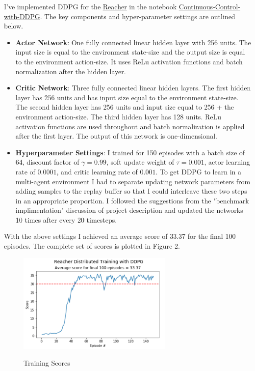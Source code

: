 \documentclass[sigchi]{acmart}
\begin{document}
I've implemented DDPG for the \href{https://github.com/Unity-Technologies/ml-agents/blob/master/docs/Learning-Environment-Examples.md#reacher}{\underline{Reacher}}
in the notebook 
\href{https://nbviewer.jupyter.org/github/bobflagg/Continuous-Control/blob/master/01-Continuous-Control-with-DDPG.ipynb}{\underline{Continuous-Control-with-DDPG}}.
The key components and hyper-parameter settings are outlined below.
\begin{itemize}
	\item \textbf{Actor Network}: One fully connected linear hidden layer with 256 units. The input size is equal to the environment state-size and the output size is equal to the environment action-size. It uses ReLu activation functions and batch normalization after the hidden layer.
	\item \textbf{Critic Network}: Three fully connected linear hidden layers. The first hidden layer has 256 units and has input size equal to the environment state-size. The second hidden layer has 256 units and input size equal to 256 + the environment action-size. The third hidden layer has 128 units. ReLu activation functions are used throughout  and batch normalization is applied after the first layer. The output of this network is one-dimensional.
	\item \textbf{Hyperparameter Settings}: 
	I trained for 150 episodes with a batch size of 64, discount factor of $\gamma = 0.99$, soft update weight of $\tau = 0.001$, actor learning rate of $0.0001$, 
	 and critic learning rate of $0.001$.  To get DDPG to learn in a multi-agent environment I had to separate updating network parameters from adding samples to the replay buffer so that I could interleave these two steps in an appropriate proportion. I followed the suggestions from the "benchmark implimentation" discussion of project description and updated the networks 10 times after every 20 timesteps. 
\end{itemize}

With the above settings I achieved an average score of 33.37 for the final 100 episodes.  The complete set of scores is plotted in Figure 2.

\begin{figure}[h]
	\centering
	\includegraphics[width=3.0in]{ddpg-scores}
	\label{fig:ddpg-scores}
	\caption{Training Scores}
\end{figure}
\end{document}
